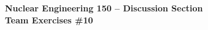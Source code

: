 \documentclass{report}
\begin{document}
\begin{center}
\textbf{\large Nuclear Engineering 150 -- Discussion Section}\\ 
\textbf{Team Exercises \#10}
\end{center}


\newpage


\end{document}
